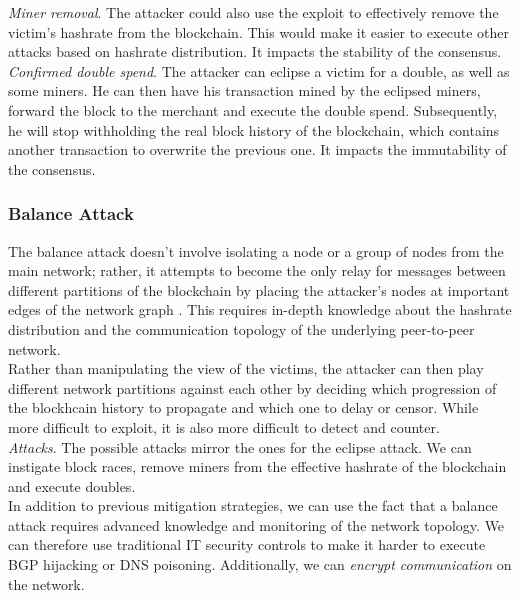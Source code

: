 \documentclass[12pt,a4paper]{article}
\begin{document}
\textit{Miner removal}. The attacker could also use the exploit to effectively remove the victim's \gls{hashrate} from the \gls{blockchain}. This would make it easier to execute other attacks based on hashrate distribution. It impacts the stability of the \gls{consensus}.\\

\textit{Confirmed double spend}. The attacker can eclipse a victim for a \gls{double}, as well as some \glspl{miner}. He can then have his transaction mined by the eclipsed miners, forward the block to the merchant and execute the double spend. Subsequently, he will stop withholding the real block history of the \gls{blockchain}, which contains another transaction to overwrite the previous one. It impacts the immutability of the \gls{consensus}.\\

\subsubsection{Balance Attack}

The balance attack doesn't involve isolating a node or a group of nodes from the main network; rather, it attempts to become the only relay for messages between different partitions of the \gls{blockchain} by placing the attacker's nodes at important edges of the network graph \cite{balance}. This requires in-depth knowledge about the \gls{hashrate} distribution and the communication topology of the underlying peer-to-peer network.\\

Rather than manipulating the view of the victims, the attacker can then play different network partitions against each other by deciding which progression of the blockhcain history to propagate and which one to delay or censor. While more difficult to exploit, it is also more difficult to detect and counter.\\

\textit{Attacks}. The possible attacks mirror the ones for the eclipse attack. We can instigate block races, remove \glspl{miner} from the effective \gls{hashrate} of the \gls{blockchain} and execute \glspl{double}.\\

In addition to previous mitigation strategies, we can use the fact that a balance attack requires advanced knowledge and monitoring of the network topology. We can therefore use traditional IT security controls to make it harder to execute BGP hijacking or DNS poisoning. Additionally, we can \textit{encrypt communication} on the network.\\
\end{document}
